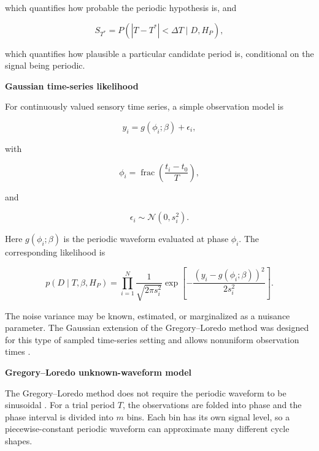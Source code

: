 \documentclass{book}
\providecommand{\ProjectDeepHeading}[2]{%
    \par\medskip\noindent\textbf{#2}\par\smallskip
}
\begin{document}
which quantifies how probable the periodic hypothesis is, and

\begin{equation}
S_{T^{\ast}}
=
P\left(\left|T-T^{\ast}\right|<\ensuremath{\Delta} T\mid D,H_P\right),
\end{equation}

which quantifies how plausible a particular candidate period is, conditional on the signal being periodic.

\ProjectDeepHeading{4}{Gaussian time-series likelihood}

For continuously valued sensory time series, a simple observation model is

\begin{equation}
y_i
=
g\!\left(\ensuremath{\phi}_i;\ensuremath{\beta}\right)+\ensuremath{\epsilon}_i,
\end{equation}

with

\begin{equation}
\ensuremath{\phi}_i
=
\operatorname{frac}\!\left(\frac{t_i-t_0}{T}\right),
\end{equation}

and

\begin{equation}
\ensuremath{\epsilon}_i\sim\mathcal{N}(0,s_i^2).
\end{equation}

Here $g(\ensuremath{\phi}_i;\ensuremath{\beta})$ is the periodic waveform evaluated at phase $\ensuremath{\phi}_i$. The corresponding likelihood is

\begin{equation}
p(D\mid T,\ensuremath{\beta},H_P)
=
\prod_{i=1}^{N}
\frac{1}{\sqrt{2\ensuremath{\pi} s_i^2}}
\exp\left[
-\frac{\left(y_i-g(\ensuremath{\phi}_i;\ensuremath{\beta})\right)^2}{2s_i^2}
\right].
\end{equation}

The noise variance may be known, estimated, or marginalized as a nuisance parameter. The Gaussian extension of the Gregory--Loredo method was designed for this type of sampled time-series setting and allows nonuniform observation times \citep{gregory-1999-bayesian-periodic-signal-detection-i-analysis-of-20-years-of-radio-flux-measurements-of-the-x-ray-binary-ls-i-plus-61-303}.

\ProjectDeepHeading{4}{Gregory--Loredo unknown-waveform model}

The Gregory--Loredo method does not require the periodic waveform to be sinusoidal \citep{gregory-1992-a-new-method-for-the-detection-of-a-periodic-signal-of-unknown-shape-and-period}. For a trial period $T$, the observations are folded into phase and the phase interval is divided into $m$ bins. Each bin has its own signal level, so a piecewise-constant periodic waveform can approximate many different cycle shapes.
\end{document}
